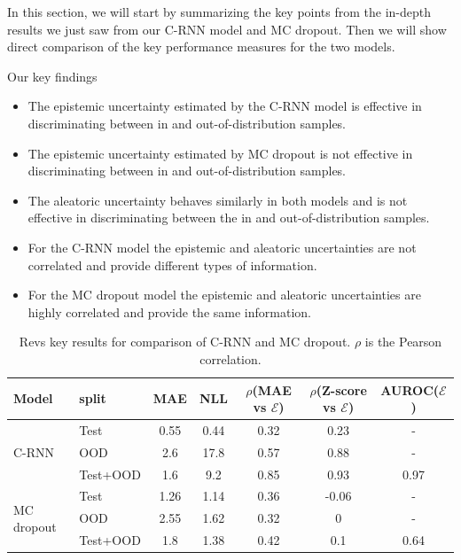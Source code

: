 In this section, we will start by summarizing the key points from the in-depth results we just saw from our C-RNN model and MC dropout. Then we will show direct comparison of the key performance measures for the two models.

Our key findings 

\begin{itemize}
    \item The epistemic uncertainty estimated by the C-RNN model is effective in discriminating between in and out-of-distribution samples.
    
    \item The epistemic uncertainty estimated by MC dropout is not effective in discriminating between in and out-of-distribution samples.
    
    \item The aleatoric uncertainty behaves similarly in both models and is not effective in discriminating between the in and out-of-distribution samples.
    
    \item For the C-RNN model the epistemic and aleatoric uncertainties are not correlated and provide different types of information.
    
    \item For the MC dropout model the epistemic and aleatoric uncertainties are highly correlated and provide the same information. 
\end{itemize}{}


\begin{table}[htbp]
\centering
    \begin{tabular}{l l c c c c c}  
        \toprule
        Model & split & MAE & NLL & $\rho$(MAE vs $\mathcal{E}$) &
        $\rho$(Z-score vs $\mathcal{E}$) & AUROC($\mathcal{E}$)\\
        \midrule
        \multirow{3}{*}{C-RNN} 
            & Test     & 0.55& 0.44 & 0.32  & 0.23 & - \\  
            & OOD      & 2.6 & 17.8 & 0.57  & 0.88 & -\\  
            & Test+OOD & 1.6 & 9.2  & 0.85  & 0.93 & 0.97\\ 

        \midrule
        \multirow{3}{*}{MC dropout} 
            & Test     & 1.26 & 1.14  & 0.36  & -0.06 & - \\  
            & OOD      & 2.55 & 1.62  & 0.32  & 0 & -\\  
            & Test+OOD & 1.8  & 1.38  & 0.42  & 0.1 & 0.64\\ 

        \toprule
    \end{tabular}
    \caption[Revs key results for comparison of C-RNN and MC dropout]{Revs key results for comparison of C-RNN and MC dropout. $\rho$ is the Pearson correlation.}
    \label{tbl:revs_comparison}
\end{table}


